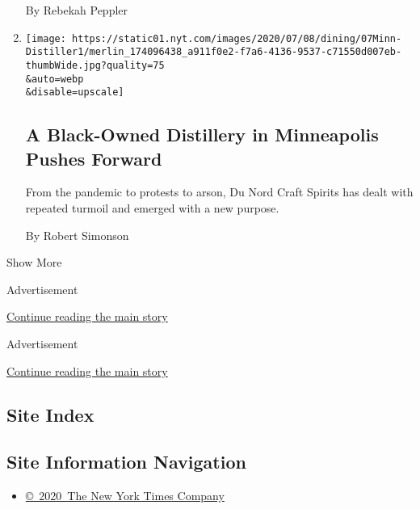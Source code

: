 \begin{enumerate}
  By Rebekah Peppler
\item
  \href{/2020/07/07/dining/drinks/du-nord-black-owned-distillery-minneapolis.html}{}

  \texttt{[image: https://static01.nyt.com/images/2020/07/08/dining/07Minn-Distiller1/merlin\_174096438\_a911f0e2-f7a6-4136-9537-c71550d007eb-thumbWide.jpg?quality=75\\\&auto=webp\\\&disable=upscale]}

  \hypertarget{a-black-owned-distillery-in-minneapolis-pushes-forward}{%
  \subsection{A Black-Owned Distillery in Minneapolis Pushes
  Forward}\label{a-black-owned-distillery-in-minneapolis-pushes-forward}}

  From the pandemic to protests to arson, Du Nord Craft Spirits has
  dealt with repeated turmoil and emerged with a new purpose.

  By Robert Simonson
\end{enumerate}

Show More

Advertisement

\protect\hyperlink{after-mid2}{Continue reading the main story}

Advertisement

\protect\hyperlink{after-mktg}{Continue reading the main story}

\hypertarget{site-index}{%
\subsection{Site Index}\label{site-index}}

\hypertarget{site-information-navigation}{%
\subsection{Site Information
Navigation}\label{site-information-navigation}}

\begin{itemize}
\tightlist
\item
  \href{https://help.nytimes.com/hc/en-us/articles/115014792127-Copyright-notice}{©~2020~The
  New York Times Company}
\end{itemize}

